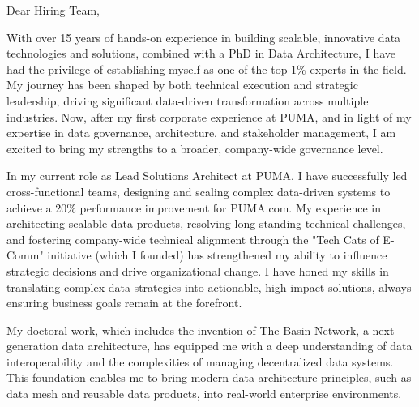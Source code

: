 \clearpage
{}




\vspace{4ex}
{\large 

Dear Hiring Team,

\vspace{2ex}
With over 15 years of hands-on experience in building scalable, innovative data technologies and solutions, combined with a PhD in Data Architecture, I have had the privilege of establishing myself as one of the top 1\% experts in the field. My journey has been shaped by both technical execution and strategic leadership, driving significant data-driven transformation across multiple industries. Now, after my first corporate experience at PUMA, and in light of my expertise in data governance, architecture, and stakeholder management, I am excited to bring my strengths to a broader, company-wide governance level.

In my current role as Lead Solutions Architect at PUMA, I have successfully led cross-functional teams, designing and scaling complex data-driven systems to achieve a 20\% performance improvement for PUMA.com. My experience in architecting scalable data products, resolving long-standing technical challenges, and fostering company-wide technical alignment through the "Tech Cats of E-Comm" initiative (which I founded) has strengthened my ability to influence strategic decisions and drive organizational change. I have honed my skills in translating complex data strategies into actionable, high-impact solutions, always ensuring business goals remain at the forefront.

My doctoral work, which includes the invention of The Basin Network, a next-generation data architecture, has equipped me with a deep understanding of data interoperability and the complexities of managing decentralized data systems. This foundation enables me to bring modern data architecture principles, such as data mesh and reusable data products, into real-world enterprise environments.

}
